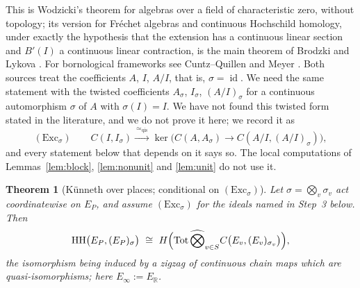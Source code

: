 \documentclass[11pt]{amsart}
\newtheorem{theorem}{Theorem}[section]
\theoremstyle{definition}
\theoremstyle{remark}
\newcommand{\R}{\mathbb R}
\newcommand{\id}{\operatorname{id}}
\newcommand{\HH}{\operatorname{HH}}
\begin{document}
This is Wodzicki's theorem \cite[Theorem~3.1]{Wodzicki} for algebras over a
field of characteristic zero, without topology; its version for Fr\'echet
algebras and continuous Hochschild homology, under exactly the hypothesis that
the extension has a continuous linear section and $B'(I)$ a continuous linear
contraction, is the main theorem of Brodzki and Lykova \cite{BrodzkiLykova}.  For bornological frameworks see Cuntz--Quillen
\cite{CuntzQuillen} and Meyer \cite{MeyerCyclic}.
Both sources treat the coefficients $A$, $I$, $A/I$, that is, $\sigma=\id$.
We need the same statement with the twisted coefficients $A_{\sigma}$,
$I_{\sigma}$, $(A/I)_{\sigma}$ for a continuous automorphism $\sigma$ of $A$
with $\sigma(I)=I$.  We have not found this twisted form stated in the
literature, and we do not prove it here; we record it as
\begin{equation}\label{eq:Excsigma}
(\mathrm{Exc}_{\sigma})\qquad
C(I,I_{\sigma})\xrightarrow{\ \simeq_{\mathrm{qis}}\ }
\ker\bigl(C(A,A_{\sigma})\to C(A/I,(A/I)_{\sigma})\bigr),
\end{equation}
and every statement below that depends on it says so.  The local computations
of Lemmas~\ref{lem:block}, \ref{lem:nonunit} and \ref{lem:unit} do not use it.

\begin{theorem}[K\"unneth over places; conditional on $(\mathrm{Exc}_{\sigma})$]\label{thm:kunneth}
Let $\sigma=\bigotimes_v\sigma_v$ act coordinatewise on $E_P$, and assume
$(\mathrm{Exc}_{\sigma})$ for the ideals named in Step~3 below.  Then
\begin{equation}\label{eq:kunneth}
\HH\bigl(E_P,(E_P)_{\sigma}\bigr)\ \cong\
H\Bigl(\mathrm{Tot}\,\widehat\bigotimes_{v\in S}C\bigl(E_v,(E_v)_{\sigma_v}\bigr)\Bigr),
\end{equation}
the isomorphism being induced by a zigzag of continuous chain maps which are
quasi-isomorphisms; here $E_{\infty}:=E_{\R}$.
\end{theorem}
\end{document}
